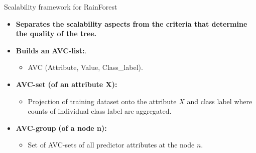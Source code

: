 \documentclass[aspectratio=169,t,table]{beamer}
\begin{document}
  {
    \begin{frame}{Scalability framework for RainForest}
      \begin{itemize}
        \item \textbf{Separates the scalability aspects from the criteria that determine the quality of the tree.}
        \item \textbf{Builds an} \textbf{\color{airforceblue}AVC-list:}.
        \begin{itemize}
          \item AVC (Attribute, Value, Class\_label).
        \end{itemize}
        \item \textbf{\color{airforceblue}AVC-set} \textbf{(of an attribute X):}
        \begin{itemize}
          \item Projection of training dataset onto the attribute $X$ and class label where counts of individual class label are aggregated.
        \end{itemize}
        \item \textbf{\color{airforceblue}AVC-group} \textbf{(of a node n):}
        \begin{itemize}
          \item Set of AVC-sets of all predictor attributes at the node $n$.
        \end{itemize}
      \end{itemize}
    \end{frame}
  }
\end{document}
